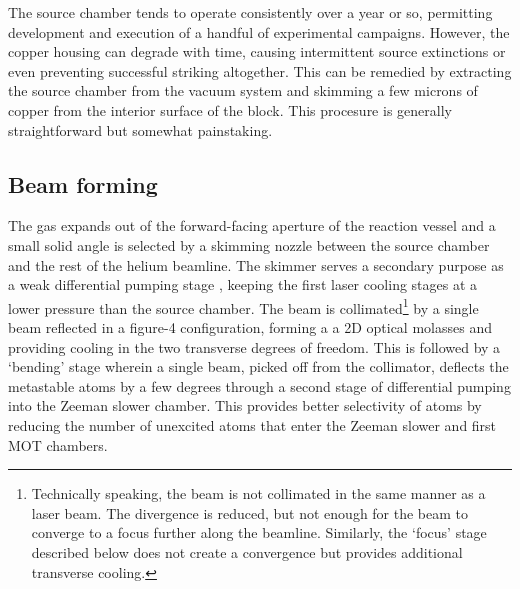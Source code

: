 	The source chamber tends to operate consistently over a year or so, permitting development and execution of a handful of experimental campaigns. However, the copper housing can degrade with time, causing intermittent source extinctions or even preventing successful striking altogether. This can be remedied by extracting the source chamber from the vacuum system and skimming a few microns of copper from the interior surface of the block. This procesure is generally straightforward but somewhat painstaking. 

\subsection*{Beam forming}

	The gas expands out of the forward-facing aperture of the reaction vessel and a small solid angle is selected by a skimming nozzle between the source chamber and the rest of the helium beamline. The skimmer serves a secondary purpose as a weak differential pumping stage , keeping the first laser cooling stages at a lower pressure than the source chamber. The beam is collimated\footnote{Technically speaking, the beam is not collimated in the same manner as a laser beam. The divergence is reduced, but not enough for the beam to converge to a focus further along the beamline. Similarly, the `focus' stage described below does not create a convergence but provides additional transverse cooling.} by a single beam reflected in a figure-4 configuration, forming a a 2D optical molasses\cite{Lett81,rooijakkers96} and providing cooling in the two transverse degrees of freedom. This is followed by a `bending' stage wherein a single beam, picked off from the collimator, deflects the metastable atoms by a few degrees through a second stage of differential pumping into the Zeeman slower chamber. This provides better selectivity of \mhe atoms by reducing the number of unexcited atoms that enter the Zeeman slower and first MOT chambers. 

